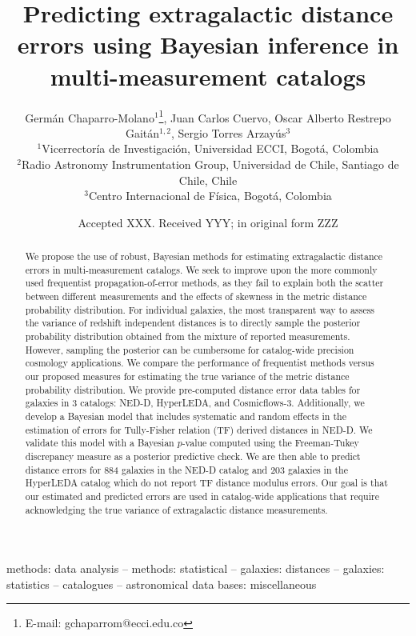 \documentclass[a4paper,fleqn,usenatbib]{mnras}
\title[Predicting extragalactic distance errors]{Predicting extragalactic distance errors using Bayesian inference in multi-measurement catalogs}
\author[G. Chaparro-Molano et al.]{Germ\'an Chaparro-Molano$^{1}$\thanks{E-mail: gchaparrom@ecci.edu.co},
Juan Carlos Cuervo,
Oscar Alberto Restrepo Gait\'an$^{1,2}$, \newauthor
Sergio Torres Arzay\'{u}s$^{3}$
\\
$^{1}$Vicerrector\'ia de Investigaci\'on, Universidad ECCI, Bogot\'a, Colombia\\
$^{2}$Radio Astronomy Instrumentation Group, Universidad de Chile, Santiago de Chile, Chile\\
$^{3}$Centro Internacional de F\'isica, Bogot\'a, Colombia
}
\date{Accepted XXX. Received YYY; in original form ZZZ}
\begin{document}
\label{firstpage}
\pagerange{\pageref{firstpage}--\pageref{lastpage}}
\maketitle

\begin{abstract}
We propose the use of robust, Bayesian methods for estimating extragalactic distance errors in multi-measurement catalogs. We seek to improve upon the more commonly used frequentist propagation-of-error methods, as they fail to explain both the scatter between different measurements and the effects of skewness in the metric distance probability distribution. For individual galaxies, the most transparent way to assess the variance of redshift independent distances is to directly sample the posterior probability distribution obtained from the mixture of reported measurements. However, sampling the posterior can be cumbersome for catalog-wide precision cosmology applications. We compare the performance of frequentist methods versus our proposed measures for estimating the true variance of the metric distance probability distribution. We provide pre-computed distance error data tables for galaxies in 3 catalogs: NED-D, HyperLEDA, and Cosmicflows-3. Additionally, we develop a Bayesian model that includes systematic and random effects in the estimation of errors for Tully-Fisher relation (TF) derived distances in NED-D. We validate this model with a Bayesian $p$-value computed using the Freeman-Tukey discrepancy measure as a posterior predictive check. We are then able to predict distance errors for 884 galaxies in the NED-D catalog and 203 galaxies in the HyperLEDA catalog which do not report TF distance modulus errors. Our goal is that our estimated and predicted errors are used in catalog-wide applications that require acknowledging the true variance of extragalactic distance measurements.
\end{abstract}

\begin{keywords}
methods: data analysis -- methods: statistical -- galaxies: distances -- galaxies: statistics -- catalogues -- astronomical data bases: miscellaneous
\end{keywords}


\end{document}
